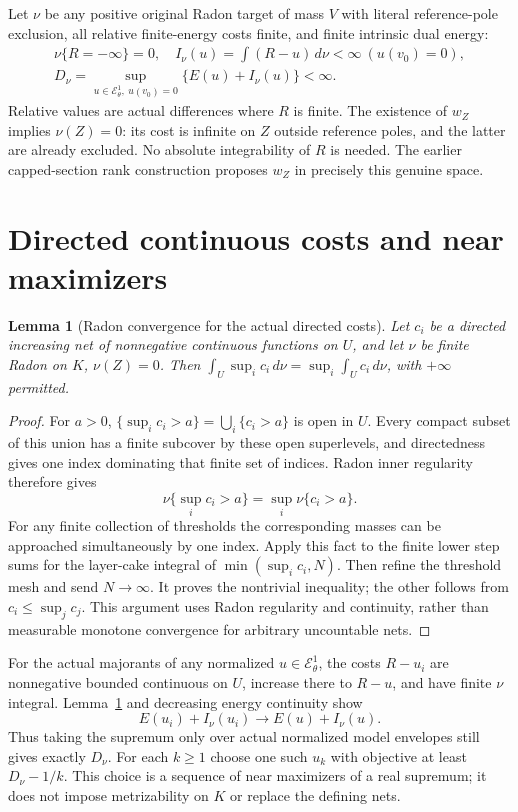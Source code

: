 \documentclass[11pt]{article}
\newtheorem{lemma}[theorem]{Lemma}
\newcommand{\EE}{\mathcal E^1_\theta}
\begin{document}
Let $\nu$ be any positive original Radon target of mass $V$ with
literal reference-pole exclusion, all relative finite-energy costs
finite, and finite intrinsic dual energy:
\[
 \begin{gathered}
 \nu\{R=-\infty\}=0,\quad
 I_\nu(u)=\int(R-u)\,d\nu<\infty\ (u(v_0)=0),\\
 D_\nu=\sup_{u\in\EE,\ u(v_0)=0}\{E(u)+I_\nu(u)\}<\infty.
 \end{gathered}                                             \tag{3}
\]
Relative values are actual differences where $R$ is finite.
The existence of $w_Z$ implies $\nu(Z)=0$: its cost is infinite
on $Z$ outside reference poles, and the latter are already excluded.
No absolute integrability of $R$ is needed. The earlier capped-section
rank construction proposes $w_Z$ in precisely this genuine space.

\section{Directed continuous costs and near maximizers}
\begin{lemma}[Radon convergence for the actual directed costs]\label{radon}
Let $c_i$ be a directed increasing net of nonnegative continuous
functions on $U$, and let $\nu$ be finite Radon on $K$, $\nu(Z)=0$.
Then $\int_U\sup_i c_i\,d\nu=\sup_i\int_U c_i\,d\nu$,
with $+\infty$ permitted.
\end{lemma}
\begin{proof}
For $a>0$, $\{\sup_i c_i>a\}=\bigcup_i\{c_i>a\}$ is open in $U$.
Every compact subset of this union has a finite subcover by these
open superlevels, and directedness gives one index dominating that
finite set of indices. Radon inner regularity therefore gives
\[
 \nu\{\sup_i c_i>a\}=\sup_i\nu\{c_i>a\}.
\]
For any finite collection of thresholds the corresponding masses can
be approached simultaneously by one index. Apply this fact to the
finite lower step sums for the layer-cake integral of
$\min(\sup_i c_i,N)$. Then refine the threshold mesh and send
$N\to\infty$. It proves the nontrivial inequality; the other follows
from $c_i\leq\sup_jc_j$. This argument uses Radon regularity and
continuity, rather than measurable monotone convergence for arbitrary
uncountable nets.
\end{proof}

For the actual majorants of any normalized $u\in\EE$, the costs
$R-u_i$ are nonnegative bounded continuous on $U$, increase there
to $R-u$, and have finite $\nu$ integral. Lemma~\ref{radon} and
decreasing energy continuity show
\[
 E(u_i)+I_\nu(u_i)\longrightarrow E(u)+I_\nu(u).             \tag{4}
\]
Thus taking the supremum only over actual normalized model envelopes
still gives exactly $D_\nu$. For each $k\geq1$ choose one such
$u_k$ with objective at least $D_\nu-1/k$.
This choice is a sequence of near maximizers of a real supremum;
it does not impose metrizability on $K$ or replace the defining nets.
\end{document}
